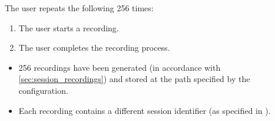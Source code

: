 \begin{tests}
    {The \gls{user} repeats the following 256 times:
    \begin{enumerate}
        \item The \gls{user} starts a recording.
        \item The \gls{user} completes the recording process.
    \end{enumerate}}
    {\begin{itemize}
        \item 256 recordings have been generated (in accordance with \ref{sec:session_recordings}) and stored at the path specified by the configuration.
        \item Each recording contains a different \gls{session} identifier (as specified in ).
    \end{itemize}}


\end{tests}
